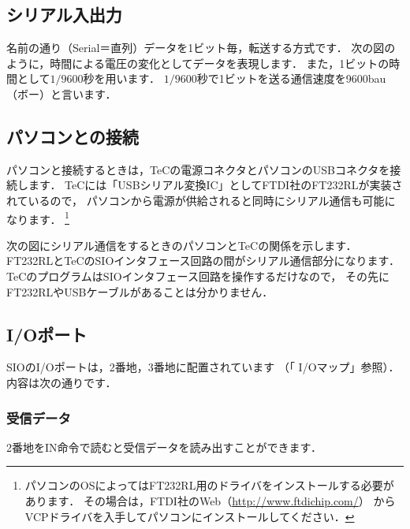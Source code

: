 \subsection{シリアル入出力}
名前の通り（Serial＝直列）データを1ビット毎，転送する方式です．
次の図のように，時間による電圧の変化としてデータを表現します．
また，1ビットの時間として$1/9600$秒を用います．
$1/9600$秒で1ビットを送る通信速度を9600bau（ボー）と言います．

\begin{center}
\end{center}

\subsection{パソコンとの接続}
パソコンと接続するときは，TeCの電源コネクタとパソコンのUSBコネクタを接続します．
TeCには「USBシリアル変換IC」としてFTDI社のFT232RLが実装されているので，
パソコンから電源が供給されると同時にシリアル通信も可能になります．
\footnote{パソコンのOSによってはFT232RL用のドライバをインストールする必要があります．
その場合は，FTDI社のWeb（\url{http://www.ftdichip.com/}）
からVCPドライバを入手してパソコンにインストールしてください．}

次の図にシリアル通信をするときのパソコンとTeCの関係を示します．
FT232RLとTeCのSIOインタフェース回路の間がシリアル通信部分になります．
TeCのプログラムはSIOインタフェース回路を操作するだけなので，
その先にFT232RLやUSBケーブルがあることは分かりません．

\begin{center}
\end{center}

\subsection{I/Oポート}
\label{sioport}

SIOのI/Oポートは，2番地，3番地に配置されています
（「 I/Oマップ」参照）．
内容は次の通りです．

\subsubsection{受信データ}
2番地をIN命令で読むと受信データを読み出すことができます．

